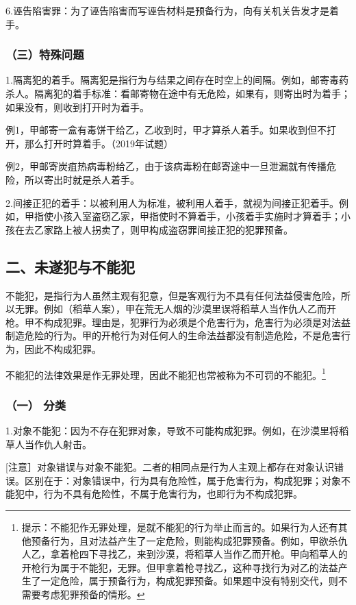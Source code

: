 6.诬告陷害罪：为了诬告陷害而写诬告材料是预备行为，向有关机关告发才是着手。

\subsubsection*{（三）特殊问题}

1.隔离犯的着手。隔离犯是指行为与结果之间存在时空上的间隔。例如，邮寄毒药杀人。隔离犯的着手标准：看邮寄物在途中有无危险，如果有，则寄出时为着手；如果没有，则收到打开时为着手。

例1，甲邮寄一盒有毒饼干给乙，乙收到时，甲才算杀人着手。如果收到但不打开，那么打开时算着手。（2019年试题）

例2，甲邮寄炭疽热病毒粉给乙，由于该病毒粉在邮寄途中一旦泄漏就有传播危险，所以寄出时就是杀人着手。

2.间接正犯的着手：以被利用人为标准，被利用人着手，就视为间接正犯着手。例如，甲指使小孩入室盗窃乙家，甲指使时不算着手，小孩着手实施时才算着手；小孩在去乙家路上被人拐卖了，则甲构成盗窃罪间接正犯的犯罪预备。

\subsection*{二、未遂犯与不能犯}

不能犯，是指行为人虽然主观有犯意，但是客观行为不具有任何法益侵害危险，所以无罪。例如（稻草人案），甲在荒无人烟的沙漠里误将稻草人当作仇人乙而开枪。甲不构成犯罪。理由是，犯罪行为必须是个危害行为，危害行为必须是对法益制造危险的行为。甲的开枪行为对任何人的生命法益都没有制造危险，不是危害行为，因此不构成犯罪。

不能犯的法律效果是作无罪处理，因此不能犯也常被称为不可罚的不能犯。\footnote{提示：不能犯作无罪处理，是就不能犯的行为举止而言的。如果行为人还有其他预备行为，且对法益产生了一定危险，则能构成犯罪预备。例如，甲欲杀仇人乙，拿着枪四下寻找乙，来到沙漠，将稻草人当作乙而开枪。甲向稻草人的开枪行为属于不能犯，无罪。但甲拿着枪寻找乙，这种寻找行为对乙的法益产生了一定危险，属于预备行为，构成犯罪预备。如果题中没有特别交代，则不需要考虑犯罪预备的情形。}

\subsubsection*{（一） 分类}

1.对象不能犯：因为不存在犯罪对象，导致不可能构成犯罪。例如，在沙漠里将稻草人当作仇人射击。

[注意］对象错误与对象不能犯。二者的相同点是行为人主观上都存在对象认识错误。区别在于：对象错误中，行为具有危险性，属于危害行为，构成犯罪；对象不能犯中，行为不具有危险性，不属于危害行为，也即行为不构成犯罪。

